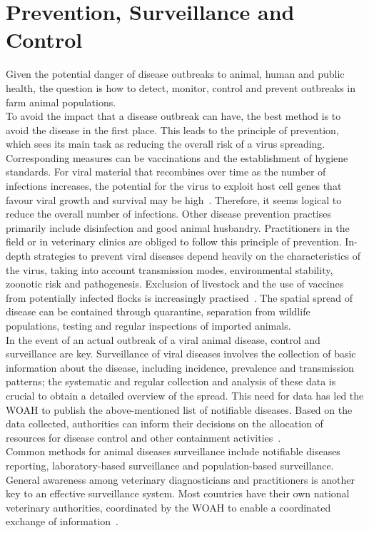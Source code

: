 \section{Prevention, Surveillance and Control}
Given the potential danger of disease outbreaks to animal, human and public health, the question is how to detect, monitor, control and prevent outbreaks in farm animal populations. \\
To avoid the impact that a disease outbreak can have, the best method is to avoid the disease in the first place. This leads to the principle of prevention, which sees its main task as reducing the overall risk of a virus spreading. Corresponding measures can be vaccinations and the establishment of hygiene standards. For viral material that recombines over time as the number of infections increases, the potential for the virus to exploit host cell genes that favour viral growth and survival may be high~\cite{fenner2017maclachlan}. Therefore, it seems logical to reduce the overall number of infections. Other disease prevention practises primarily include disinfection and good animal husbandry. Practitioners in the field or in veterinary clinics are obliged to follow this principle of prevention. In-depth strategies to prevent viral diseases depend heavily on the characteristics of the virus, taking into account transmission modes, environmental stability, zoonotic risk and pathogenesis. Exclusion of livestock and the use of vaccines from potentially infected flocks is increasingly practised~\cite{fenner2017maclachlan}. The spatial spread of disease can be contained through quarantine, separation from wildlife populations, testing and regular inspections of imported animals. \\
In the event of an actual outbreak of a viral animal disease, control and surveillance are key. Surveillance of viral diseases involves the collection of basic information about the disease, including incidence, prevalence and transmission patterns; the systematic and regular collection and analysis of these data is crucial to obtain a detailed overview of the spread. This need for data has led the WOAH to publish the above-mentioned list of notifiable diseases. Based on the data collected, authorities can inform their decisions on the allocation of resources for disease control and other containment activities~\cite{fenner2017maclachlan, who2017one}. \\
Common methods for animal diseases surveillance include notifiable diseases reporting, laboratory-based surveillance and population-based surveillance. General awareness among veterinary diagnosticians and practitioners is another key to an effective surveillance system. Most countries have their own national veterinary authorities, coordinated by the WOAH to enable a coordinated exchange of information~\cite{who2017one}. \\
